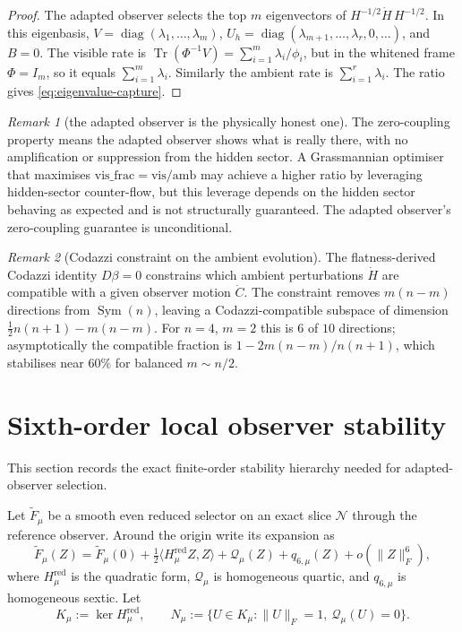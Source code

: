 \documentclass[11pt,a4paper]{article}
\numberwithin{equation}{section}
\DeclareMathOperator{\Tr}{Tr}
\DeclareMathOperator{\Sym}{Sym}
\DeclareMathOperator{\diag}{diag}
\theoremstyle{thmcompact}
\theoremstyle{remark}
\newtheorem*{remarkplain}{Remark}
\newenvironment{remark}[1][]%
{\begin{remarkbox}\begin{remarkplain}[#1]\normalfont}
{\end{remarkplain}\end{remarkbox}}
\begin{document}
\begin{proof}
The adapted observer selects the top $m$ eigenvectors of $H^{-1/2}\dot H\,H^{-1/2}$. In this eigenbasis, $V=\diag(\lambda_1,\dots,\lambda_m)$, $U_h=\diag(\lambda_{m+1},\dots,\lambda_r,0,\dots)$, and $B=0$. The visible rate is $\Tr(\Phi^{-1}V)=\sum_{i=1}^m\lambda_i/\phi_i$, but in the whitened frame $\Phi=I_m$, so it equals $\sum_{i=1}^m\lambda_i$. Similarly the ambient rate is $\sum_{i=1}^r\lambda_i$. The ratio gives \eqref{eq:eigenvalue-capture}.
\end{proof}

\begin{remark}[the adapted observer is the physically honest one]
The zero-coupling property means the adapted observer shows what is really there, with no amplification or suppression from the hidden sector. A Grassmannian optimiser that maximises $\mathrm{vis\_frac}=\mathrm{vis}/\mathrm{amb}$ may achieve a higher ratio by leveraging hidden-sector counter-flow, but this leverage depends on the hidden sector behaving as expected and is not structurally guaranteed. The adapted observer's zero-coupling guarantee is unconditional.
\end{remark}

\begin{remark}[Codazzi constraint on the ambient evolution]
The flatness-derived Codazzi identity $D\beta=0$ constrains which ambient perturbations $\dot H$ are compatible with a given observer motion $\dot C$. The constraint removes $m(n-m)$ directions from $\Sym(n)$, leaving a Codazzi-compatible subspace of dimension $\tfrac12 n(n+1)-m(n-m)$. For $n=4$, $m=2$ this is $6$ of $10$ directions; asymptotically the compatible fraction is $1-2m(n-m)/n(n+1)$, which stabilises near $60\%$ for balanced $m\sim n/2$.
\end{remark}

\section{Sixth-order local observer stability}

This section records the exact finite-order stability hierarchy needed for adapted-observer selection.

Let $\widetilde F_{\mu}$ be a smooth even reduced selector on an exact slice $\mathcal N$ through the reference observer. Around the origin write its expansion as
\begin{equation}
\widetilde F_{\mu}(Z)=\widetilde F_{\mu}(0)+\tfrac12\langle H_{\mu}^{\mathrm{red}}Z,Z\rangle+\mathcal Q_{\mu}(Z)+q_{6,\mu}(Z)+o(\|Z\|_F^6),
\label{eq:selector-expansion}
\end{equation}
where $H_{\mu}^{\mathrm{red}}$ is the quadratic form, $\mathcal Q_{\mu}$ is homogeneous quartic, and $q_{6,\mu}$ is homogeneous sextic. Let
\begin{equation}
K_{\mu}:=\ker H_{\mu}^{\mathrm{red}},
\qquad
N_{\mu}:=\{U\in K_{\mu}:\|U\|_F=1,\ \mathcal Q_{\mu}(U)=0\}.
\label{eq:K-and-N}
\end{equation}
\end{document}
